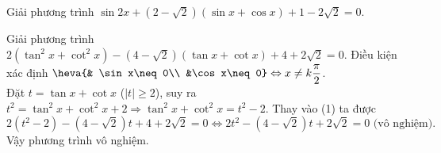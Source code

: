 

\begin{bt}%

	Giải phương trình $ \sin 2x+(2-\sqrt{2})(\sin x+\cos x)+1-2\sqrt{2}=0 $.
\end{bt}

\begin{bt}%

	Giải phương trình $ 2(\tan^{2}x+\cot^{2}x)-(4-\sqrt{2})(\tan x+\cot x)+4+2\sqrt{2}=0 $.
	\loigiai
	{
		Điều kiện xác định $ \heva{& \sin x\neq 0\\ &\cos x\neq 0}\Leftrightarrow x\neq k\dfrac{\pi}{2} $.\\
		Đặt $ t=\tan x+\cot x $	($ |t|\geq 2 $), suy ra $ t^{2}=\tan^{2}x+\cot^{2}x+2\Rightarrow \tan^{2}x+\cot^{2}x=t^{2}-2 $. Thay vào (1) ta được
		\[
		2(t^{2}-2)-(4-\sqrt{2})t+4+2\sqrt{2}=0\Leftrightarrow 2t^{2}-(4-\sqrt{2})t+2\sqrt{2}=0\text{ (vô nghiệm)}.
		\]
		Vậy phương trình vô nghiệm.
	}
\end{bt}

